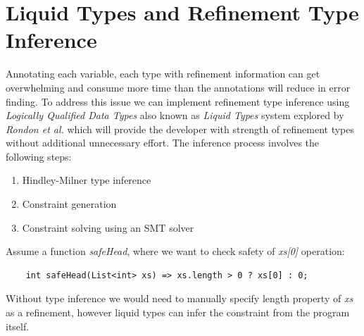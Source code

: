 \section{Liquid Types and Refinement Type Inference}
\label{sec:liquid_types}
Annotating each variable, each type with refinement information can get
overwhelming and consume more time than the annotations will reduce in error finding.
To address this issue we can implement refinement type inference using \textit{Logically Qualified Data Types} also
known as \textit{Liquid Types} system explored by \textit{Rondon et al.}\cite{rondonLiquidTypes2008}
which will provide the developer with strength of refinement types without additional unnecessary effort.
The inference process involves the following steps:
\begin{enumerate}
    \item Hindley-Milner type inference \cite{damasPrincipalTypeSchemesFunctional}
    \item Constraint generation
    \item Constraint solving using an SMT solver \cite{demouraZ3EfficientSMT2008}
\end{enumerate}
Assume a function \textit{safeHead}, where we want to check safety of \textit{xs[0]} operation:
\begin{lstlisting}
    int safeHead(List<int> xs) => xs.length > 0 ? xs[0] : 0;
\end{lstlisting}
Without type inference we would need to manually specify length property of \textit{xs}
as a refinement, however liquid types can infer the constraint from the program itself. 


